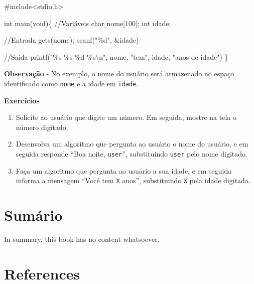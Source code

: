 \documentclass[
  letterpaper,
  DIV=11,
  numbers=noendperiod]{scrreprt}
\newenvironment{Shaded}{\begin{snugshade}}{\end{snugshade}}
\newcommand{\CommentTok}[1]{\textcolor[rgb]{0.37,0.37,0.37}{#1}}
\newcommand{\DataTypeTok}[1]{\textcolor[rgb]{0.68,0.00,0.00}{#1}}
\newcommand{\DecValTok}[1]{\textcolor[rgb]{0.68,0.00,0.00}{#1}}
\newcommand{\ImportTok}[1]{\textcolor[rgb]{0.00,0.46,0.62}{#1}}
\newcommand{\NormalTok}[1]{\textcolor[rgb]{0.00,0.23,0.31}{#1}}
\newcommand{\OperatorTok}[1]{\textcolor[rgb]{0.37,0.37,0.37}{#1}}
\newcommand{\PreprocessorTok}[1]{\textcolor[rgb]{0.68,0.00,0.00}{#1}}
\newcommand{\SpecialCharTok}[1]{\textcolor[rgb]{0.37,0.37,0.37}{#1}}
\newcommand{\StringTok}[1]{\textcolor[rgb]{0.13,0.47,0.30}{#1}}
\newlength{\cslhangindent}
\newenvironment{CSLReferences}[2] %
 {\begin{list}{}{%
  \setlength{\itemindent}{0pt}
  \setlength{\leftmargin}{0pt}
  \setlength{\parsep}{0pt}
  \ifodd #1
   \setlength{\leftmargin}{\cslhangindent}
   \setlength{\itemindent}{-1\cslhangindent}
  \fi
  \setlength{\itemsep}{#2\baselineskip}}}
 {\end{list}}
\begin{document}
\begin{Shaded}
\begin{Highlighting}[]
  \PreprocessorTok{\#include}\ImportTok{\textless{}stdio.h\textgreater{}}

  \DataTypeTok{int}\NormalTok{ main}\OperatorTok{(}\DataTypeTok{void}\OperatorTok{)\{}
    \CommentTok{//Variáveis}
    \DataTypeTok{char}\NormalTok{ nome}\OperatorTok{[}\DecValTok{100}\OperatorTok{];}
    \DataTypeTok{int}\NormalTok{ idade}\OperatorTok{;}

    \CommentTok{//Entrada}
\NormalTok{    gets}\OperatorTok{(}\NormalTok{nome}\OperatorTok{);}
\NormalTok{    scanf}\OperatorTok{(}\StringTok{"}\SpecialCharTok{\%d}\StringTok{"}\OperatorTok{,} \OperatorTok{\&}\NormalTok{idade}\OperatorTok{)}

    \CommentTok{//Saída}
\NormalTok{    printf}\OperatorTok{(}\StringTok{"}\SpecialCharTok{\%s}\StringTok{ }\SpecialCharTok{\%s}\StringTok{ }\SpecialCharTok{\%d}\StringTok{ }\SpecialCharTok{\%s\textbackslash{}n}\StringTok{"}\OperatorTok{,}\NormalTok{ nome}\OperatorTok{,} \StringTok{"tem"}\OperatorTok{,}\NormalTok{ idade}\OperatorTok{,} \StringTok{"anos de idade"}\OperatorTok{)}
  \OperatorTok{\}}
\end{Highlighting}
\end{Shaded}

\textbf{Observação} - No exemplo, o nome do usuário será armazenado no
espaço identificado como \texttt{nome} e a idade em \texttt{idade}.

\textbf{Exercícios}

\begin{enumerate}
\def\labelenumi{\arabic{enumi}.}
\item
  Solicite ao usuário que digite um número. Em seguida, mostre na tela o
  número digitado.
\item
  Desenvolva um algoritmo que pergunta ao usuário o nome do usuário, e
  em seguida responde ``Boa noite, \texttt{user}'', substituindo
  \texttt{user} pelo nome digitado.
\item
  Faça um algoritmo que pergunta ao usuário a sua idade, e em seguida
  informa a mensagem ``Você tem \texttt{X} anos'', substituindo
  \texttt{X} pela idade digitada.
\end{enumerate}


\chapter{Sumário}\label{sumuxe1rio}

In summary, this book has no content whatsoever.


\chapter*{References}\label{references}


\label{refs}
\begin{CSLReferences}{0}{1}
\end{CSLReferences}
\end{document}
